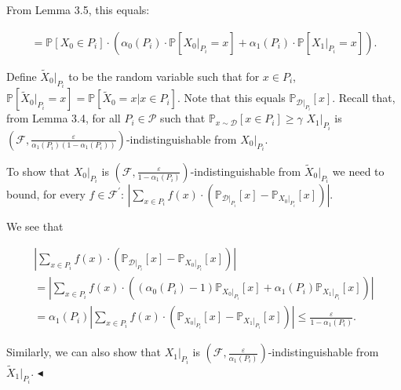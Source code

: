 \documentclass[10pt,a4paper]{article}
\begin{document}
From Lemma 3.5, this equals:\par


\[\begin{gathered}
=\mathbb{P}[X_{0}\in P_{i}]\cdot\left(\alpha_{0}(P_{i})\cdot\mathbb{P}[X_{0}|_{P_{i}}=x]+\alpha_{1}(P_{i})\cdot\mathbb{P}[X_{1}|_{P_{i}}=x]\right).
\end{gathered}\]


Define $\widetilde{X}_{0}|_{P_{i}}$ to be the random variable such that for $x\in P_{i}$, $\mathbb{P}[\widetilde{X}_{0}|_{P_{i}}=x]=\mathbb{P}[\widetilde{X}_{0}=x|x\in P_{i}]$. Note that this equals $\mathbb{P}_{\mathcal{D}|_{P_{i}}}[x]$. Recall that, from Lemma 3.4, for all $P_{i}\in\mathcal{P}$ such that $\mathbb{P}_{x\sim\mathcal{D}}[x\in P_{i}]\geq\gamma$ $X_{1}|_{P_{i}}$ is $(\mathcal{F},\frac{\varepsilon}{\alpha_{1}(P_{i})(1-\alpha_{1}(P_{i}))})$-indistinguishable from $X_{0}|_{P_{i}}$.\par




To show that $X_{0}|_{P_{i}}$ is $(\mathcal{F},\frac{\varepsilon}{1-\alpha_{1}(P_{i})})$-indistinguishable from $\widetilde{X}_{0}|_{P_{i}}$ we need to bound, for every $f\in\mathcal{F}^{\prime}$:
$\left|\sum_{x\in P_{i}}f(x)\cdot\left(\mathbb{P}_{\mathcal{D}|_{P_{i}}}[x]-\mathbb{P}_{X_{0}|_{P_{i}}}[x]\right)\right|.$\par




We see that\par


\[\begin{gathered}
\displaystyle\left|\sum_{x\in P_{i}}f(x)\cdot\left(\mathbb{P}_{\mathcal{D}|_{P_{i}}}[x]-\mathbb{P}_{X_{0}|_{P_{i}}}[x]\right)\right| \\
\displaystyle=\left|\sum_{x\in P_{i}}f(x)\cdot\left((\alpha_{0}(P_{i})-1)\mathbb{P}_{X_{0}|_{P_{i}}}[x]+\alpha_{1}(P_{i})\mathbb{P}_{X_{1}|_{P_{i}}}[x]\right)\right| \\
\displaystyle=\alpha_{1}(P_{i})\left|\sum_{x\in P_{i}}f(x)\cdot\left(\mathbb{P}_{X_{0}|_{P_{i}}}[x]-\mathbb{P}_{X_{1}|_{P_{i}}}[x]\right)\right|\leq\frac{\varepsilon}{1-\alpha_{1}(P_{i})}.
\end{gathered}\]


Similarly, we can also show that $X_{1}|_{P_{i}}$ is $(\mathcal{F},\frac{\varepsilon}{\alpha_{1}(P_{i})})$-indistinguishable from $\widetilde{X}_{1}|_{P_{i}}$.
$\blacktriangleleft$\par
\end{document}
